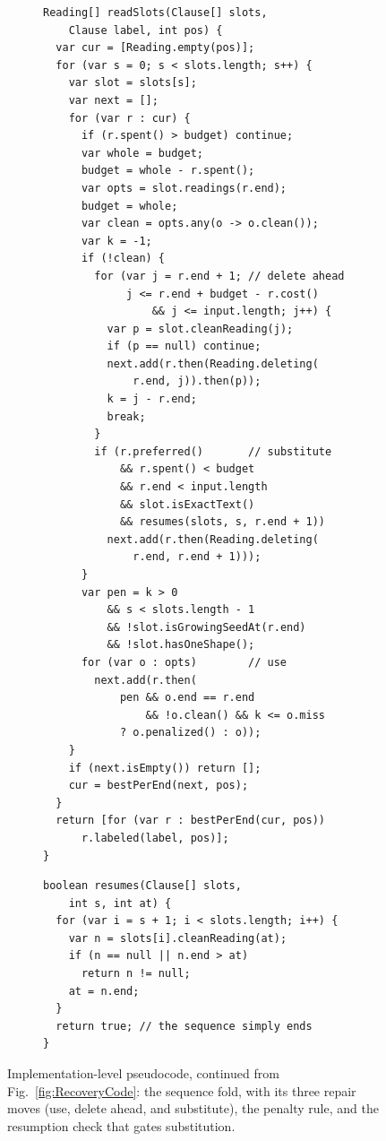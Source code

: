 \documentclass[manuscript]{acmart}
\begin{document}
\begin{figure}
\centering
\begin{subfigure}[t]{.46\linewidth}
\begin{lstlisting}[firstnumber=110]
Reading[] readSlots(Clause[] slots,
    Clause label, int pos) {
  var cur = [Reading.empty(pos)];
  for (var s = 0; s < slots.length; s++) {
    var slot = slots[s];
    var next = [];
    for (var r : cur) {
      if (r.spent() > budget) continue;
      var whole = budget;
      budget = whole - r.spent();
      var opts = slot.readings(r.end);
      budget = whole;
      var clean = opts.any(o -> o.clean());
      var k = -1;
      if (!clean) {
        for (var j = r.end + 1; // delete ahead
             j <= r.end + budget - r.cost()
                 && j <= input.length; j++) {
          var p = slot.cleanReading(j);
          if (p == null) continue;
          next.add(r.then(Reading.deleting(
              r.end, j)).then(p));
          k = j - r.end;
          break;
        }
        if (r.preferred()       // substitute
            && r.spent() < budget
            && r.end < input.length
            && slot.isExactText()
            && resumes(slots, s, r.end + 1))
          next.add(r.then(Reading.deleting(
              r.end, r.end + 1)));
      }
      var pen = k > 0
          && s < slots.length - 1
          && !slot.isGrowingSeedAt(r.end)
          && !slot.hasOneShape();
      for (var o : opts)        // use
        next.add(r.then(
            pen && o.end == r.end
                && !o.clean() && k <= o.miss
            ? o.penalized() : o));
    }
    if (next.isEmpty()) return [];
    cur = bestPerEnd(next, pos);
  }
  return [for (var r : bestPerEnd(cur, pos))
      r.labeled(label, pos)];
}
\end{lstlisting}
\end{subfigure}
\hspace{5mm}
\begin{subfigure}[t]{.46\linewidth}
\begin{lstlisting}[firstnumber=160]
boolean resumes(Clause[] slots,
    int s, int at) {
  for (var i = s + 1; i < slots.length; i++) {
    var n = slots[i].cleanReading(at);
    if (n == null || n.end > at)
      return n != null;
    at = n.end;
  }
  return true; // the sequence simply ends
}
\end{lstlisting}
\end{subfigure}
\caption{Implementation-level pseudocode, continued from Fig.~\ref{fig:RecoveryCode}: the sequence fold, with its three repair moves (use, delete ahead, and substitute), the penalty rule, and the resumption check that gates substitution.}
\label{fig:RecoveryCodeSlots}
\end{figure}
\end{document}
